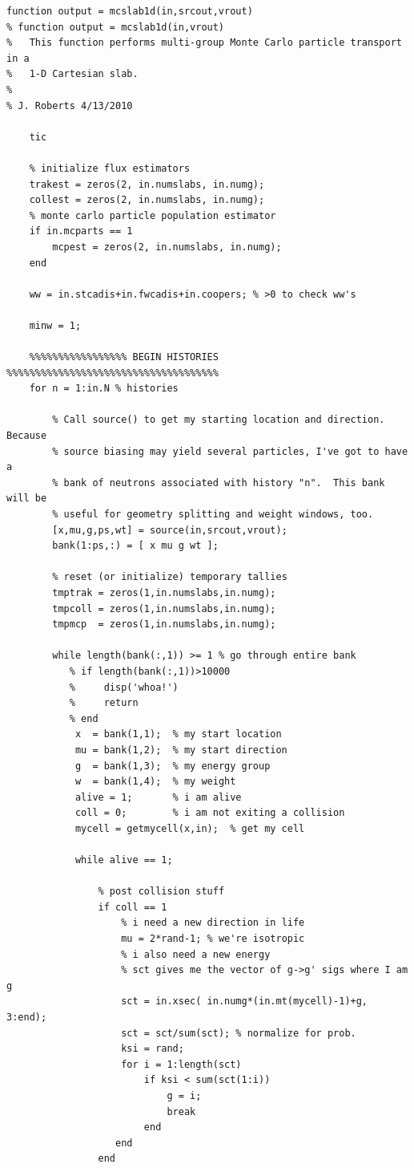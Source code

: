 \documentclass[letter,11pt]{article}
\begin{document}
{\small
\begin{verbatim}
function output = mcslab1d(in,srcout,vrout)
% function output = mcslab1d(in,vrout)
%   This function performs multi-group Monte Carlo particle transport in a
%   1-D Cartesian slab.
%
% J. Roberts 4/13/2010

	tic
	
	% initialize flux estimators
	trakest = zeros(2, in.numslabs, in.numg);
	collest = zeros(2, in.numslabs, in.numg);
    % monte carlo particle population estimator
    if in.mcparts == 1
        mcpest = zeros(2, in.numslabs, in.numg);
    end
    
    ww = in.stcadis+in.fwcadis+in.coopers; % >0 to check ww's

	minw = 1;
    
    %%%%%%%%%%%%%%%%% BEGIN HISTORIES %%%%%%%%%%%%%%%%%%%%%%%%%%%%%%%%%%%%%
    for n = 1:in.N % histories

        % Call source() to get my starting location and direction.  Because
        % source biasing may yield several particles, I've got to have a
        % bank of neutrons associated with history "n".  This bank will be
        % useful for geometry splitting and weight windows, too.
        [x,mu,g,ps,wt] = source(in,srcout,vrout);
        bank(1:ps,:) = [ x mu g wt ];
        
        % reset (or initialize) temporary tallies
        tmptrak = zeros(1,in.numslabs,in.numg);
        tmpcoll = zeros(1,in.numslabs,in.numg);
        tmpmcp  = zeros(1,in.numslabs,in.numg);
        
        while length(bank(:,1)) >= 1 % go through entire bank
           % if length(bank(:,1))>10000
           %     disp('whoa!')
           %     return
           % end
            x  = bank(1,1);  % my start location
            mu = bank(1,2);  % my start direction
            g  = bank(1,3);  % my energy group
            w  = bank(1,4);  % my weight
            alive = 1;       % i am alive
            coll = 0;        % i am not exiting a collision
            mycell = getmycell(x,in);  % get my cell
            
            while alive == 1;
                
                % post collision stuff
                if coll == 1
                    % i need a new direction in life
                    mu = 2*rand-1; % we're isotropic
                    % i also need a new energy 
                    % sct gives me the vector of g->g' sigs where I am g
                    sct = in.xsec( in.numg*(in.mt(mycell)-1)+g, 3:end);
                    sct = sct/sum(sct); % normalize for prob.
                    ksi = rand;
                    for i = 1:length(sct)
                        if ksi < sum(sct(1:i))
                            g = i;
                            break
                        end
                   end           
                end
                

\end{verbatim}}
\end{document}
